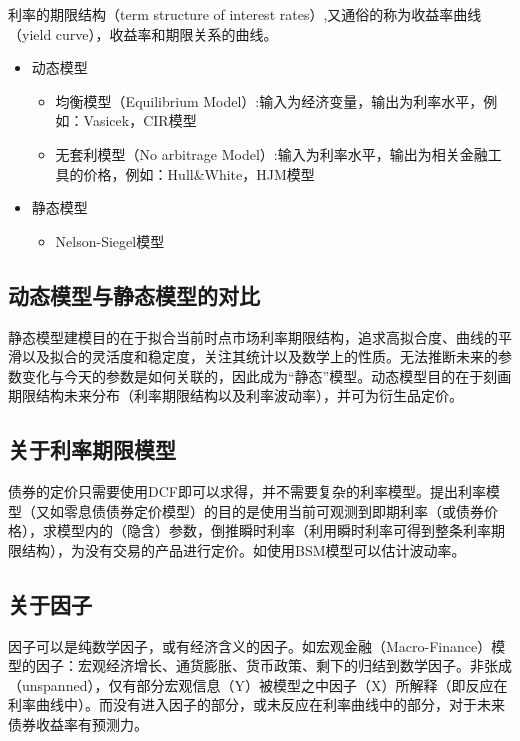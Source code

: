 \documentclass[11pt]{article}
\begin{document}
利率的期限结构（term structure of interest rates）,又通俗的称为收益率曲线（yield curve），收益率和期限关系的曲线。
\begin{itemize}
    \item 动态模型
    \begin{itemize}
        \item 均衡模型（Equilibrium Model）:输入为经济变量，输出为利率水平，例如：Vasicek，CIR模型
        \item 无套利模型（No arbitrage Model）:输入为利率水平，输出为相关金融工具的价格，例如：Hull\&White，HJM模型
    \end{itemize}
    \item 静态模型
    \begin{itemize}
        \item Nelson-Siegel模型
    \end{itemize}
\end{itemize}

\subsection{动态模型与静态模型的对比}

静态模型建模目的在于拟合当前时点市场利率期限结构，追求高拟合度、曲线的平滑以及拟合的灵活度和稳定度，关注其统计以及数学上的性质。无法推断未来的参数变化与今天的参数是如何关联的，因此成为“静态”模型。动态模型目的在于刻画期限结构未来分布（利率期限结构以及利率波动率），并可为衍生品定价。 

\subsection{关于利率期限模型}

债券的定价只需要使用DCF即可以求得，并不需要复杂的利率模型。提出利率模型（又如零息债债券定价模型）的目的是使用当前可观测到即期利率（或债券价格），求模型内的（隐含）参数，倒推瞬时利率（利用瞬时利率可得到整条利率期限结构），为没有交易的产品进行定价。如使用BSM模型可以估计波动率。

\subsection{关于因子}

因子可以是纯数学因子，或有经济含义的因子。如宏观金融（Macro-Finance）模型的因子：宏观经济增长、通货膨胀、货币政策、剩下的归结到数学因子。非张成（unspanned），仅有部分宏观信息（Y）被模型之中因子（X）所解释（即反应在利率曲线中）。而没有进入因子的部分，或未反应在利率曲线中的部分，对于未来债券收益率有预测力。
\end{document}
